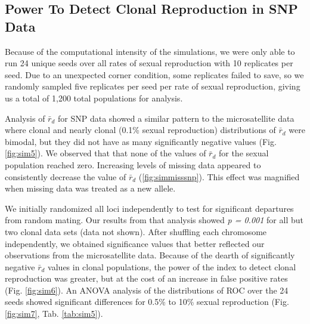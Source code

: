 \documentclass[double,11pt]{beavtex}
\begin{document}
  \subsection{Power To Detect Clonal Reproduction in SNP
  Data}\label{power-to-detect-clonal-reproduction-in-snp-data}
  
  Because of the computational intensity of the simulations, we were only
  able to run 24 unique seeds over all rates of sexual reproduction with
  10 replicates per seed. Due to an unexpected corner condition, some
  replicates failed to save, so we randomly sampled five replicates per
  seed per rate of sexual reproduction, giving us a total of 1,200 total
  populations for analysis.
  
  Analysis of \(\bar{r}_d\) for SNP data showed a similar pattern to the
  microsatellite data where clonal and nearly clonal (0.1\% sexual
  reproduction) distributions of \(\bar{r}_d\) were bimodal, but they did
  not have as many significantly negative values (Fig. \ref{fig:sim5}). We
  observed that that none of the values of \(\bar{r}_d\) for the sexual
  population reached zero. Increasing levels of missing data appeared to
  consistently decrease the value of \(\bar{r}_d\) (\ref{fig:simmisssnp}).
  This effect was magnified when missing data was treated as a new allele.
  
  We initially randomized all loci independently to test for significant
  departures from random mating. Our results from that analysis showed
  \emph{p = 0.001} for all but two clonal data sets (data not shown).
  After shuffling each chromosome independently, we obtained significance
  values that better reflected our observations from the microsatellite
  data. Because of the dearth of significantly negative \(\bar{r}_d\)
  values in clonal populations, the power of the index to detect clonal
  reproduction was greater, but at the cost of an increase in false
  positive rates (Fig. \ref{fig:sim6}). An ANOVA analysis of the
  distributions of ROC over the 24 seeds showed significant differences
  for 0.5\% to 10\% sexual reproduction (Fig. \ref{fig:sim7}, Tab.
  \ref{tab:sim5}).
  
\end{document}
